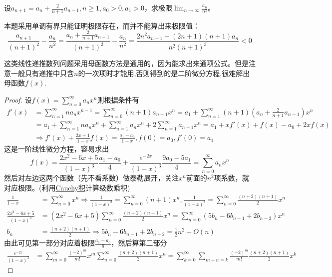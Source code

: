\documentclass[../../main.tex]{subfiles}%
\begin{document}
\begin{example}
设\(a_{n + 1}=a_n+\frac{2}{n + 1}a_{n - 1},n\geqslant 1,a_0>0,a_1>0\)，求极限\(\lim_{n\rightarrow\infty}\frac{a_n}{n^2}\)。
\end{example}
\begin{remark}
本题采用单调有界只能证明极限存在，而并不能算出来极限值：
\[
\frac{a_{n + 1}}{(n + 1)^2}-\frac{a_n}{n^2}=\frac{a_n+\frac{2}{n + 1}a_{n - 1}}{(n + 1)^2}-\frac{a_n}{n^2}=\frac{2n^2a_{n - 1}-(2n + 1)(n + 1)a_n}{n^2(n + 1)^3}<0
\]
\end{remark}
\begin{remark}
这类线性递推数列问题采用母函数方法是通用的，因为能求出来通项公式。但是注意一般只有递推中只含$n$的一次项时才能用,否则得到的是二阶微分方程,很难解出母函数$f(x)$.
\end{remark}
\begin{proof}
设\(f(x)=\sum_{n = 0}^{\infty}a_nx^n\)则根据条件有
\begin{align*}
f'(x)&=\sum_{n = 1}^{\infty}na_nx^{n - 1}=\sum_{n = 0}^{\infty}(n + 1)a_{n + 1}x^n=a_1+\sum_{n = 1}^{\infty}(n + 1)\left(a_n+\frac{2}{n + 1}a_{n - 1}\right)x^n\\
&=a_1+\sum_{n = 1}^{\infty}na_nx^n+\sum_{n = 1}^{\infty}a_nx^n+2\sum_{n = 1}^{\infty}a_{n - 1}x^n=a_1+xf'(x)+f(x)-a_0+2xf(x)\\
&\Rightarrow f'(x)+\frac{2x + 1}{1 - x}f(x)=\frac{a_1 - a_0}{1 - x},f(0)=a_0,f'(0)=a_1
\end{align*}
这是一阶线性微分方程，容易求出
\[f(x)=\frac{2x^2 - 6x + 5}{(1 - x)^3}\frac{a_1 - a_0}{4}+\frac{e^{-2x}}{(1 - x)^3}\frac{9a_0 - 5a_1}{4}=\sum_{n = 0}^{\infty}a_nx^n\]
然后对左边这两个函数（先不看系数）做泰勒展开，关注\(x^n\)前面的\(n^2\)项系数，就对应极限。(利用\hyperref[corollary:收敛级数Cauchy积收敛则就等于级数积]{Cauchy积}计算级数乘积)
\begin{align*}
\frac{1}{1 - x}&=\sum_{n = 0}^{\infty}x^n\Rightarrow\frac{1}{(1 - x)^2}=\sum_{n = 0}^{\infty}(n + 1)x^n,\frac{1}{(1 - x)^3}=\sum_{n = 0}^{\infty}\frac{(n + 2)(n + 1)}{2}x^n\\
\frac{2x^2 - 6x + 5}{(1 - x)^3}&=(2x^2 - 6x + 5)\sum_{n = 0}^{\infty}\frac{(n + 2)(n + 1)}{2}x^n=\sum_{n = 0}^{\infty}(5b_n - 6b_{n - 1}+2b_{n - 2})x^n\\
b_n&=\frac{(n + 2)(n + 1)}{2}\Rightarrow 5b_n - 6b_{n - 1}+2b_{n - 2}=\frac{1}{2}n^2+O(n)
\end{align*}
由此可见第一部分对应着极限\(\frac{a_1 - a_0}{8}\)，然后算第二部分
\begin{align*}
\frac{e^{-2x}}{(1 - x)^3}&=\sum_{m = 0}^{\infty}\frac{(-2)^m}{m!}x^m\sum_{n = 0}^{\infty}\frac{(n + 2)(n + 1)}{2}x^n=\sum_{k = 0}^{\infty}\sum_{m + n = k}\frac{(-2)^m}{m!}\frac{(n + 2)(n + 1)}{2}x^k

\end{align*}
\end{proof}
\end{document}
